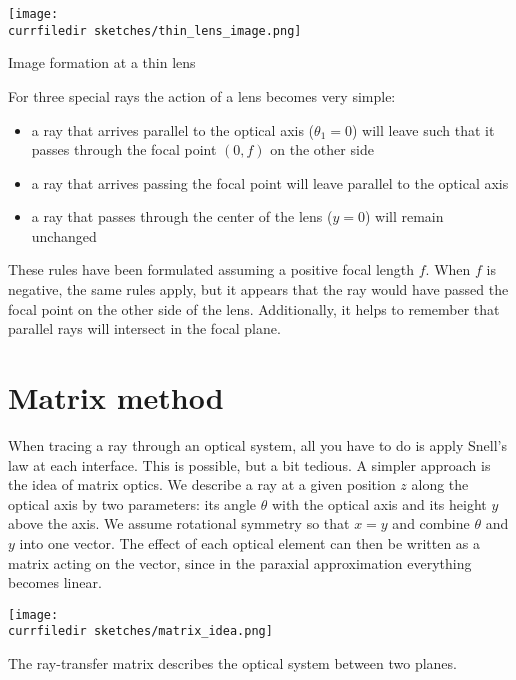 \begin{marginfigure}
    \texttt{[image: \\currfiledir sketches/thin\_lens\_image.png]}
   \caption{Image formation at a  thin lens}
   \label{fig:1_thin_lens_image}
\end{marginfigure}


For three special rays the action of a lens becomes very simple:
\begin{itemize}\setlength{\itemsep}{0pt}
    \item a ray that arrives parallel to the optical axis ($\theta_1 = 0$) will leave such that it passes through the focal point $(0,f)$ on the other side
    \item  a ray that arrives passing the  focal point will leave parallel to the optical axis
    \item a ray that passes through the center of the lens ($y = 0$) will remain unchanged
\end{itemize}
These rules have been formulated assuming a positive focal length $f$. When $f$ is negative, the same rules apply, but it  appears that the ray would have passed the  focal point on the other side of the lens. Additionally, it helps to remember that parallel rays will intersect in the focal plane.


\section{Matrix method}
When tracing a ray through an optical system, all you have to do is apply Snell's law at each interface. This is possible, but a bit tedious. A simpler approach is the idea of matrix optics. We describe a ray at a given position $z$ along the optical axis by two parameters: its angle $\theta$ with the optical axis and its height $y$ above the axis. We assume rotational symmetry so that $x=y$ and combine $\theta$ and $y$ into one vector. The effect of each optical element can then be written as a matrix acting on the vector, since in the paraxial approximation everything becomes linear.

\begin{marginfigure}
    \texttt{[image: \\currfiledir sketches/matrix\_idea.png]}
   \caption{The ray-transfer matrix describes the optical system between two planes.}
\end{marginfigure}

